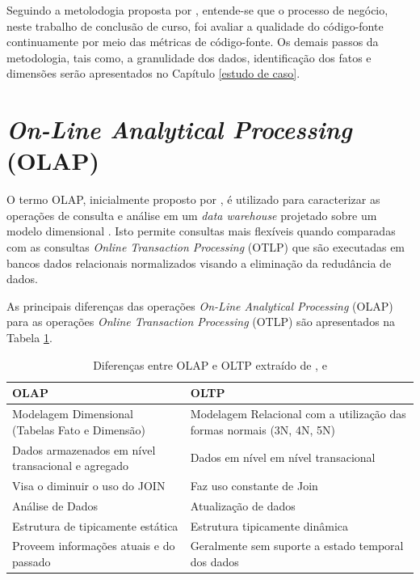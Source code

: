 Seguindo a metolodogia proposta por , entende-se que o processo de negócio, neste trabalho de conclusão de curso, foi avaliar a qualidade do código-fonte continuamente por meio das métricas de código-fonte.
Os demais passos da metodologia, tais como, a granulidade dos dados, identificação dos fatos e dimensões serão apresentados no Capítulo \ref{estudo de caso}.




\section{\textit{On-Line Analytical Processing} (OLAP)}

O termo OLAP, inicialmente proposto por , é utilizado para caracterizar as operações de consulta e análise em um \textit{data warehouse} projetado sobre um modelo dimensional \cite{Kimball2002}. Isto permite consultas mais flexíveis quando comparadas com as consultas \textit{Online Transaction Processing} (OTLP) que são executadas em bancos dados relacionais normalizados  visando a eliminação da redudância de dados.

As principais diferenças das operações \textit{On-Line Analytical Processing} (OLAP) para as operações 
\textit{Online Transaction Processing} (OTLP) são apresentados na Tabela 
\ref{olapxoltp}.

	\begin{table}[!ht]
	\begin{center}
	 \begin{tabular}{|p{5cm}|p{5cm}|}
		\hline
		OLAP & OLTP \\ \hline
		Modelagem Dimensional (Tabelas Fato e Dimensão) & Modelagem Relacional com a utilização das formas normais (3N, 4N, 5N) \\ \hline
		Dados armazenados em nível transacional e agregado    & Dados em nível em nível transacional        \\ \hline
		Visa o diminuir o uso do JOIN & Faz uso constante de Join   \\ \hline
		Análise de Dados & Atualização de dados
		\\ \hline
		Estrutura de tipicamente estática  & Estrutura tipicamente dinâmica      \\ \hline
		Proveem informações atuais e do passado & Geralmente sem suporte a estado temporal dos dados
		      \\ \hline

		\end{tabular}
		\caption{Diferenças entre OLAP e OLTP extraído de ,  e }
		\label{olapxoltp}
		\end{center}
		\end{table}
		\FloatBarrier

